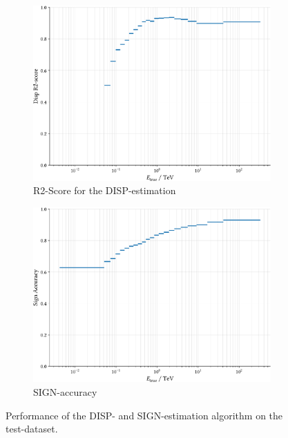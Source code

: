\begin{figure}
    \begin{subfigure}{0.45\textwidth}
        \includegraphics[width=0.9\linewidth]{../analysis/plots/disp_test_r2_equal_filled.pdf} 
        \caption{R2-Score for the DISP-estimation}
    \end{subfigure}
    \begin{subfigure}{0.45\textwidth}
        \includegraphics[width=0.9\linewidth]{../analysis/plots/disp_test_acc_equal_filled.pdf}
        \caption{SIGN-accuracy}
    \end{subfigure}
    \caption{Performance of the DISP- and SIGN-estimation algorithm on the test-dataset.}
    \label{fig:disp_test_perf}
\end{figure}

